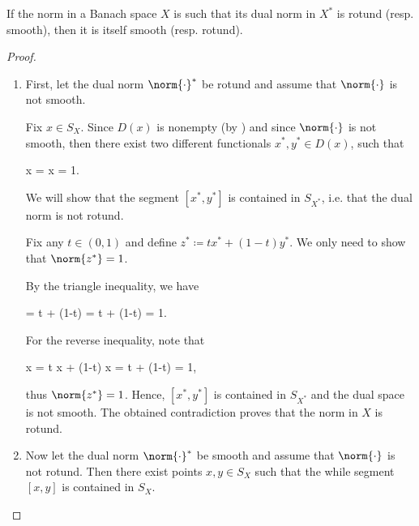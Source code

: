 \begin{theorem}\label{thm:smooth_rotund_norm_duality}
  If the norm in a Banach space \( X \) is such that its dual norm in \( X^* \) is rotund (resp. smooth), then it is itself smooth (resp. rotund).
\end{theorem}
\begin{proof}
  \begin{enumerate}
    \item First, let the dual norm \( \norm{\cdot}^* \) be rotund and assume that \( \norm{\cdot} \) is not smooth.

          Fix \( x \in S_X \). Since \( D(x) \) is nonempty (by ) and since \( \norm{\cdot} \) is not smooth, then there exist two different functionals \( x^*, y^* \in D(x) \), such that
          \begin{balign*}
             x
            =
             x
            =
            1.
          \end{balign*}

          We will show that the segment \( [x^*, y^*] \) is contained in \( S_{X^*} \), i.e. that the dual norm is not rotund.

          Fix any \( t \in (0, 1) \) and define \( z^* \coloneqq t x^* + (1-t) y^* \). We only need to show that \( \norm{z^*} = 1 \).

          By the triangle inequality, we have
          \begin{balign*}
            =
            \leq
            t  + (1-t) 
            =
            t + (1-t)
            =
            1.
          \end{balign*}

          For the reverse inequality, note that
          \begin{balign*}
            \geq
             x
            =
            t  x + (1-t)  x
            =
            t + (1-t)
            =
            1,
          \end{balign*}
          thus \( \norm{z^*} = 1 \). Hence, \( [x^*, y^*] \) is contained in \( S_{X^*} \) and the dual space is not smooth. The obtained contradiction proves that the norm in \( X \) is rotund.

    \item Now let the dual norm \( \norm{\cdot}^* \) be smooth and assume that \( \norm{\cdot} \) is not rotund. Then there exist points \( x, y \in S_X \) such that the while segment \( [x, y] \) is contained in \( S_X \).


\end{enumerate}
\end{proof}
